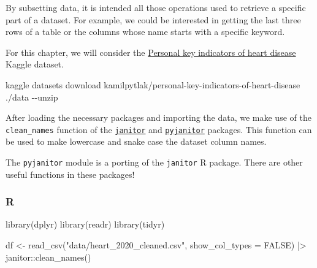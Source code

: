 \documentclass[
  letterpaper,
  DIV=11,
  numbers=noendperiod]{scrreprt}
\newenvironment{Shaded}{\begin{snugshade}}{\end{snugshade}}
\newcommand{\AttributeTok}[1]{\textcolor[rgb]{0.40,0.46,0.14}{#1}}
\newcommand{\ConstantTok}[1]{\textcolor[rgb]{0.56,0.35,0.01}{#1}}
\newcommand{\ExtensionTok}[1]{\textcolor[rgb]{0.00,0.46,0.62}{#1}}
\newcommand{\FunctionTok}[1]{\textcolor[rgb]{0.28,0.35,0.67}{#1}}
\newcommand{\NormalTok}[1]{\textcolor[rgb]{0.00,0.46,0.62}{#1}}
\newcommand{\OtherTok}[1]{\textcolor[rgb]{0.00,0.46,0.62}{#1}}
\newcommand{\SpecialCharTok}[1]{\textcolor[rgb]{0.37,0.37,0.37}{#1}}
\newcommand{\StringTok}[1]{\textcolor[rgb]{0.13,0.47,0.30}{#1}}
\begin{document}
By subsetting data, it is intended all those operations used to retrieve
a specific part of a dataset. For example, we could be interested in
getting the last three rows of a table or the columns whose name starts
with a specific keyword.

For this chapter, we will consider the
\href{https://www.kaggle.com/kamilpytlak/personal-key-indicators-of-heart-disease}{Personal
key indicators of heart disease} Kaggle dataset.

\begin{Shaded}
\begin{Highlighting}[]
\ExtensionTok{kaggle}\NormalTok{ datasets download kamilpytlak/personal{-}key{-}indicators{-}of{-}heart{-}disease ./data }\AttributeTok{{-}{-}unzip}
\end{Highlighting}
\end{Shaded}

After loading the necessary packages and importing the data, we make use
of the \texttt{clean\_names} function of the
\href{https://CRAN.R-project.org/package=janitor}{\texttt{janitor}} and
\href{https://pyjanitor-devs.github.io/pyjanitor/}{\texttt{pyjanitor}}
packages. This function can be used to make lowercase and snake case the
dataset column names.

\begin{tcolorbox}[standard jigsaw,bottomtitle=1mm, opacitybacktitle=0.6, coltitle=black, colback=white, arc=.35mm, leftrule=.75mm, titlerule=0mm, rightrule=.15mm, opacityback=0, colframe=quarto-callout-tip-color-frame, title=\textcolor{quarto-callout-tip-color}{\faLightbulb}\hspace{0.5em}{The janitor package}, toprule=.15mm, colbacktitle=quarto-callout-tip-color!10!white, bottomrule=.15mm, toptitle=1mm, left=2mm]
The \texttt{pyjanitor} module is a porting of the \texttt{janitor} R
package. There are other useful functions in these packages!
\end{tcolorbox}

\hypertarget{r-12}{%
\subsubsection{R}\label{r-12}}

\begin{Shaded}
\begin{Highlighting}[]
\FunctionTok{library}\NormalTok{(dplyr)}
\FunctionTok{library}\NormalTok{(readr)}
\FunctionTok{library}\NormalTok{(tidyr)}

\NormalTok{df }\OtherTok{\textless{}{-}} \FunctionTok{read\_csv}\NormalTok{(}\StringTok{"data/heart\_2020\_cleaned.csv"}\NormalTok{, }\AttributeTok{show\_col\_types =} \ConstantTok{FALSE}\NormalTok{) }\SpecialCharTok{|\textgreater{}} 
\NormalTok{    janitor}\SpecialCharTok{::}\FunctionTok{clean\_names}\NormalTok{()}
\end{Highlighting}
\end{Shaded}
\end{document}
